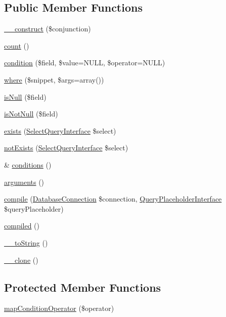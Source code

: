 \subsection*{Public Member Functions}
\begin{DoxyCompactItemize}
\item 
\hyperlink{classDatabaseCondition_aa5312271d36dcf3d3719cc44563a1056}{\_\-\_\-construct} (\$conjunction)
\item 
\hyperlink{classDatabaseCondition_a5eafb9a93459b1f1da6e93c1104c3a1c}{count} ()
\item 
\hyperlink{classDatabaseCondition_a0cb79d38e9978eb08eb863f6564d0b1d}{condition} (\$field, \$value=NULL, \$operator=NULL)
\item 
\hyperlink{classDatabaseCondition_ade864c6825d48205a1a6ec6fb1c3076f}{where} (\$snippet, \$args=array())
\item 
\hyperlink{classDatabaseCondition_af4ff7dba8bee46426fbc8b5930d860f0}{isNull} (\$field)
\item 
\hyperlink{classDatabaseCondition_aa7499e52cbf791273890fe3e1c47177b}{isNotNull} (\$field)
\item 
\hyperlink{classDatabaseCondition_ab3f1025c61cd359b097f3c1e949d4b05}{exists} (\hyperlink{interfaceSelectQueryInterface}{SelectQueryInterface} \$select)
\item 
\hyperlink{classDatabaseCondition_a435abef28b40645e5939eb521ac5407b}{notExists} (\hyperlink{interfaceSelectQueryInterface}{SelectQueryInterface} \$select)
\item 
\& \hyperlink{classDatabaseCondition_a9a399f85011d31611a0a01f9d2b30f10}{conditions} ()
\item 
\hyperlink{classDatabaseCondition_abfffa491de7087f1521e9868915f0169}{arguments} ()
\item 
\hyperlink{classDatabaseCondition_a286df1af0dfaa7ab6b8b30ed4e96a830}{compile} (\hyperlink{classDatabaseConnection}{DatabaseConnection} \$connection, \hyperlink{interfaceQueryPlaceholderInterface}{QueryPlaceholderInterface} \$queryPlaceholder)
\item 
\hyperlink{classDatabaseCondition_ac084ec53fb54ca89446acffda50b2e6a}{compiled} ()
\item 
\hyperlink{classDatabaseCondition_ac892cebcde8a71570e3a22c35fa98592}{\_\-\_\-toString} ()
\item 
\hyperlink{classDatabaseCondition_a7d229e52b09544a9ecd3a875f186f1b9}{\_\-\_\-clone} ()
\end{DoxyCompactItemize}
\subsection*{Protected Member Functions}
\begin{DoxyCompactItemize}
\item 
\hyperlink{classDatabaseCondition_afb4e820b6d1719bf940526beef27dc7a}{mapConditionOperator} (\$operator)
\end{DoxyCompactItemize}

